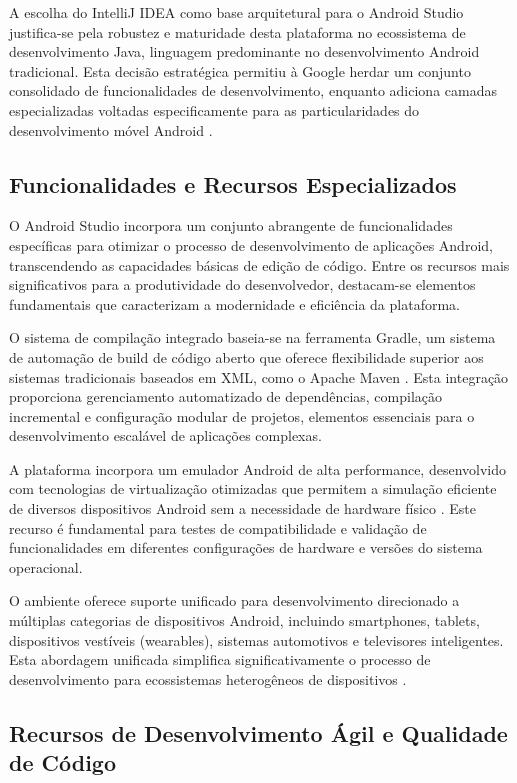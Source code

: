 A escolha do IntelliJ IDEA como base arquitetural para o Android Studio justifica-se pela robustez e maturidade desta plataforma no ecossistema de desenvolvimento Java, linguagem predominante no desenvolvimento Android tradicional. Esta decisão estratégica permitiu à Google herdar um conjunto consolidado de funcionalidades de desenvolvimento, enquanto adiciona camadas especializadas voltadas especificamente para as particularidades do desenvolvimento móvel Android \cite{meier2023android}.

\subsection{Funcionalidades e Recursos Especializados}

O Android Studio incorpora um conjunto abrangente de funcionalidades específicas para otimizar o processo de desenvolvimento de aplicações Android, transcendendo as capacidades básicas de edição de código. Entre os recursos mais significativos para a produtividade do desenvolvedor, destacam-se elementos fundamentais que caracterizam a modernidade e eficiência da plataforma.

O sistema de compilação integrado baseia-se na ferramenta Gradle, um sistema de automação de build de código aberto que oferece flexibilidade superior aos sistemas tradicionais baseados em XML, como o Apache Maven \cite{gradle2023build}. Esta integração proporciona gerenciamento automatizado de dependências, compilação incremental e configuração modular de projetos, elementos essenciais para o desenvolvimento escalável de aplicações complexas.

A plataforma incorpora um emulador Android de alta performance, desenvolvido com tecnologias de virtualização otimizadas que permitem a simulação eficiente de diversos dispositivos Android sem a necessidade de hardware físico \cite{google2023emulator}. Este recurso é fundamental para testes de compatibilidade e validação de funcionalidades em diferentes configurações de hardware e versões do sistema operacional.

O ambiente oferece suporte unificado para desenvolvimento direcionado a múltiplas categorias de dispositivos Android, incluindo smartphones, tablets, dispositivos vestíveis (wearables), sistemas automotivos e televisores inteligentes. Esta abordagem unificada simplifica significativamente o processo de desenvolvimento para ecossistemas heterogêneos de dispositivos \cite{ableson2023multiplatform}.

\subsection{Recursos de Desenvolvimento Ágil e Qualidade de Código}


